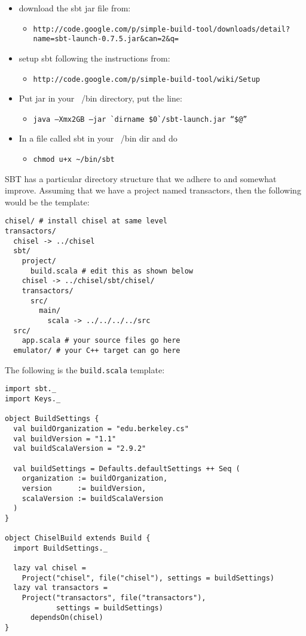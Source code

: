 \documentclass[10pt]{article}
\begin{document}
\begin{itemize}
\item download the sbt jar file from: 
\begin{itemize}
\item \verb|http://code.google.com/p/simple-build-tool/downloads/detail?name=sbt-launch-0.7.5.jar&can=2&q=|
\end{itemize}
\item setup sbt following the instructions from:  
\begin{itemize}
\item \verb|http://code.google.com/p/simple-build-tool/wiki/Setup|
\end{itemize}
\item Put jar in your ~/bin directory, put the line:
\begin{itemize}
\item \verb|java –Xmx2GB –jar `dirname $0`/sbt-launch.jar “$@”|
\end{itemize}
\item In a file called sbt in your ~/bin dir and do
\begin{itemize}
\item \verb|chmod u+x ~/bin/sbt|
\end{itemize}
\end{itemize}

SBT has a particular directory structure that we adhere to and
somewhat improve.  Assuming that we have a project named transactors,
then the following would be the template:

\begin{verbatim}
chisel/ # install chisel at same level
transactors/
  chisel -> ../chisel
  sbt/
    project/
      build.scala # edit this as shown below
    chisel -> ../chisel/sbt/chisel/
    transactors/
      src/
        main/
          scala -> ../../../../src
  src/ 
    app.scala # your source files go here
  emulator/ # your C++ target can go here
\end{verbatim}

The following is the \verb+build.scala+ template:

\begin{verbatim}
import sbt._
import Keys._

object BuildSettings {
  val buildOrganization = "edu.berkeley.cs"
  val buildVersion = "1.1"
  val buildScalaVersion = "2.9.2"

  val buildSettings = Defaults.defaultSettings ++ Seq (
    organization := buildOrganization,
    version      := buildVersion,
    scalaVersion := buildScalaVersion
  )
}

object ChiselBuild extends Build {
  import BuildSettings._

  lazy val chisel = 
    Project("chisel", file("chisel"), settings = buildSettings)
  lazy val transactors =
    Project("transactors", file("transactors"), 
            settings = buildSettings) 
      dependsOn(chisel)
}
\end{verbatim}
\end{document}
